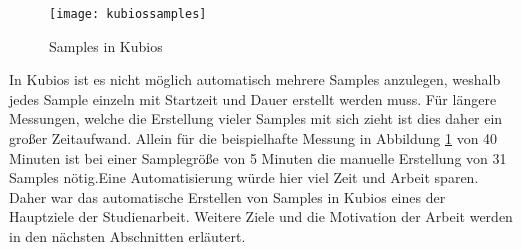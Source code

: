  \begin{figure}[H]
	\centering
	\texttt{[image: kubiossamples]}
	\caption{Samples in Kubios}
	\label{fig:kubiossamples}
\end{figure}

In Kubios ist es nicht möglich automatisch mehrere Samples anzulegen, weshalb jedes Sample einzeln mit Startzeit und Dauer erstellt werden muss. Für längere Messungen, welche die Erstellung vieler Samples mit sich zieht ist dies daher ein großer Zeitaufwand. Allein für die beispielhafte Messung in Abbildung \ref{fig:kubiossamples} von 40 Minuten ist bei einer Samplegröße von 5 Minuten die manuelle Erstellung von 31 Samples nötig.\color{red}Eine Automatisierung würde hier viel Zeit und Arbeit sparen. Daher war das automatische Erstellen von Samples in Kubios eines der Hauptziele der Studienarbeit. Weitere Ziele und die Motivation der Arbeit werden in den nächsten Abschnitten erläutert.\color{black} 